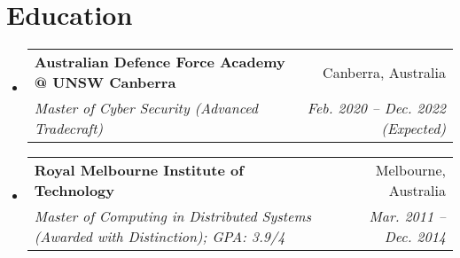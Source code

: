 \documentclass[11pt]{article}
\makeatletter
\newcommand{\resumeSubheading}[4]{
  \vspace{-1pt}\item
    \begin{tabular*}{0.97\textwidth}[t]{l@{\extracolsep{\fill}}r}
      \textbf{#1} & #2 \\
      \textit{\small#3} & \textit{\small #4} \\
    \end{tabular*}\vspace{-5pt}
}
\newcommand{\resumeSubHeadingListStart}{\begin{itemize}[leftmargin=*]}
\newcommand{\resumeSubHeadingListEnd}{\end{itemize}}
\makeatother
\begin{document}
\section{Education}
  \resumeSubHeadingListStart
    \resumeSubheading
      {Australian Defence Force Academy @ UNSW Canberra}{Canberra, Australia}
      {Master of Cyber Security (Advanced Tradecraft)}{Feb. 2020 -- Dec. 2022 (Expected)}
    \resumeSubheading
      {Royal Melbourne Institute of Technology}{Melbourne, Australia}
      {Master of Computing in Distributed Systems (Awarded with Distinction);  GPA: 3.9/4}{Mar. 2011 -- Dec. 2014}
  \resumeSubHeadingListEnd



\end{document}

